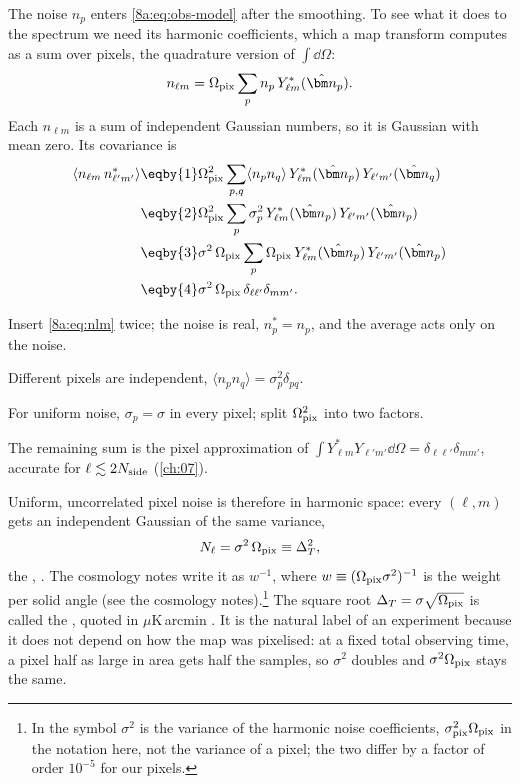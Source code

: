 The noise $n_p$ enters \eqref{8a:eq:obs-model} after the smoothing. To see what it does to
the spectrum we need its harmonic coefficients, which a map transform computes as a sum over
pixels, the quadrature version of $\int\dd\Omega$:
\begin{equation}
  n_{\ell m}=\Omega_{\rm pix}\sum_p n_p\,Y^*_{\ell m}(\hat{\bm n}_p).
  \label{8a:eq:nlm}
\end{equation}
Each $n_{\ell m}$ is a sum of independent Gaussian numbers, so it is Gaussian with mean zero.
Its covariance is
\begin{align}
  \langle n_{\ell m}\,n^*_{\ell'm'}\rangle
  &\eqby{1}\Omega_{\rm pix}^2\sum_{p,q}\langle n_p n_q\rangle\,Y^*_{\ell m}(\hat{\bm n}_p)\,Y_{\ell'm'}(\hat{\bm n}_q) \nonumber\\
  &\eqby{2}\Omega_{\rm pix}^2\sum_{p}\sigma_p^2\,Y^*_{\ell m}(\hat{\bm n}_p)\,Y_{\ell'm'}(\hat{\bm n}_p) \label{8a:eq:noise-cov-general}\\
  &\eqby{3}\sigma^2\,\Omega_{\rm pix}\sum_{p}\Omega_{\rm pix}\,Y^*_{\ell m}(\hat{\bm n}_p)\,Y_{\ell'm'}(\hat{\bm n}_p) \nonumber\\
  &\eqby{4}\sigma^2\,\Omega_{\rm pix}\,\delta_{\ell\ell'}\delta_{mm'} .
  \label{8a:eq:noise-cov}
\end{align}
\begin{explain}
  \item Insert \eqref{8a:eq:nlm} twice; the noise is real, $n_p^*=n_p$, and the average acts
        only on the noise.
  \item Different pixels are independent, $\langle n_pn_q\rangle=\sigma_p^2\delta_{pq}$.
  \item For uniform noise, $\sigma_p=\sigma$ in every pixel; split $\Omega_{\rm pix}^2$ into two factors.
  \item The remaining sum is the pixel approximation of $\int Y^*_{\ell m}Y_{\ell'm'}\dd\Omega=
        \delta_{\ell\ell'}\delta_{mm'}$, accurate for $\ell\lesssim2N_{\rm side}$ (\cref{ch:07}).
\end{explain}
Uniform, uncorrelated pixel noise is therefore  in harmonic space: every
$(\ell,m)$ gets an independent Gaussian of the same variance,
\begin{equation}
  N_\ell=\sigma^2\,\Omega_{\rm pix}\equiv\Delta_T^2 ,
  \label{8a:eq:nl}
\end{equation}
the  , \cite{Knox1995}. The cosmology notes
write it as $w^{-1}$, where $w\equiv(\Omega_{\rm pix}\sigma^2)^{-1}$ is the weight per solid
angle (see the cosmology notes).\footnote{In
 the symbol $\sigma^2$ is the variance of the harmonic
noise coefficients, $\sigma^2_{\rm pix}\Omega_{\rm pix}$ in the notation here, not the
variance of a pixel; the two differ by a factor of order $10^{-5}$ for our pixels.} The square
root $\Delta_T=\sigma\sqrt{\Omega_{\rm pix}}$ is called the , quoted in
$\mu$K\,arcmin . It is the natural label
of an experiment because it does not depend on how the map was pixelised: at a fixed total
observing time, a pixel half as large in area gets half the samples, so $\sigma^2$ doubles
and $\sigma^2\Omega_{\rm pix}$ stays the same.

